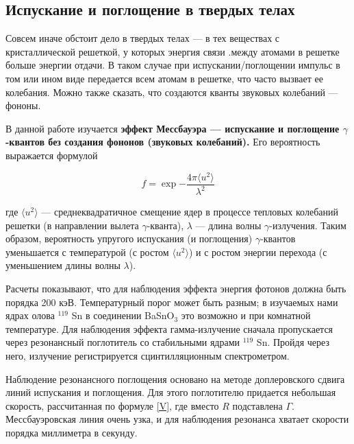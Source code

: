 \documentclass[12pt]{kiarticle} %
\begin{document}
	\subsection{Испускание и поглощение в твердых телах}
	
	Совсем иначе обстоит дело в твердых телах --- в тех веществах с кристаллической решеткой, у которых энергия связи .между атомами в решетке больше энергии отдачи. В таком случае при испускании/поглощении импульс  в том или ином виде передается всем атомам в решетке, что часто вызвает ее колебания. Можно также сказать, что создаются кванты звуковых колебаний --- фононы. 
	
	В данной работе изучается \textbf{эффект Мессбауэра --- испускание и поглощение $ \gamma $-квантов без создания фононов (звуковых колебаний).} Его вероятность выражается формулой 
	
	\begin{equation}\label{}
	f = \exp{-\dfrac{4\pi \langle u^2 \rangle}{\lambda^2}}
	\end{equation}
	
	где $ \langle u^2 \rangle $ --- среднеквадратичное смещение ядер в процессе тепловых колебаний решетки (в направлении вылета $ \gamma $-кванта), $ \lambda $ --- длина волны $ \gamma $-излучения. Таким образом, вероятность упругого испускания (и поглощения) $ \gamma $-квантов уменьшается с температурой (с ростом $  \langle u^2 \rangle $) и с ростом энергии перехода (с уменьшением длины волны $ \lambda $).
	
	Расчеты показывают, что для наблюдения эффекта энергия фотонов должна быть порядка 200 кэВ. Температурный порог может быть разным; в изучаемых нами ядрах олова $ ^{119} $ Sn в соединении BaSnO$_3$ это возможно и при комнатной температуре. Для наблюдения эффекта гамма-излучение сначала пропускается через резонансный поглотитель со стабильными ядрами $ ^{119} $ Sn. Пройдя через него, излучение регистрируется сцинтилляционным спектрометром.  
	
	Наблюдение резонансного поглощения основано на методе доплеровского сдвига линий испускания и поглощения. Для этого поглотителю придается небольшая скорость, рассчитанная по формуле \eqref{V}, где вместо $ R $ подставлена $ \Gamma $. Мессбауэровская линия очень узка, и для наблюдения резонанса хватает скорости порядка миллиметра в секунду. 
	
\end{document}
